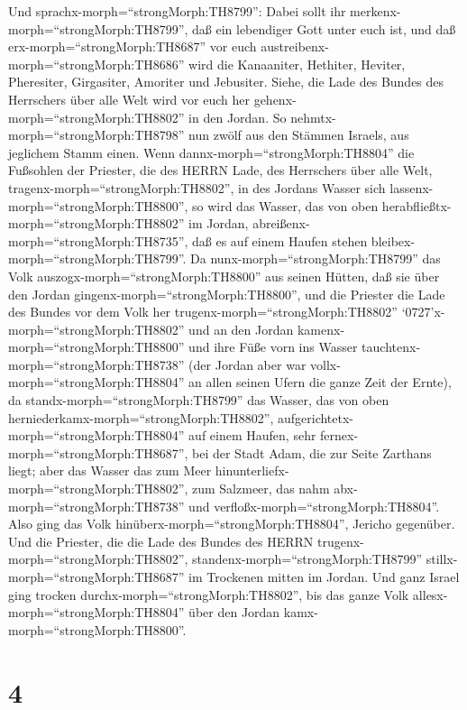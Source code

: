  Und sprachx-morph=``strongMorph:TH8799'': Dabei sollt ihr
merkenx-morph=``strongMorph:TH8799'', daß ein lebendiger Gott unter euch
ist, und daß erx-morph=``strongMorph:TH8687'' vor euch
austreibenx-morph=``strongMorph:TH8686'' wird die Kanaaniter, Hethiter,
Heviter, Pheresiter, Girgasiter, Amoriter und Jebusiter. 
Siehe, die Lade des Bundes des Herrschers über alle Welt wird vor euch
her gehenx-morph=``strongMorph:TH8802'' in den Jordan.  So
nehmtx-morph=``strongMorph:TH8798'' nun zwölf aus den Stämmen Israels,
aus jeglichem Stamm einen.  Wenn
dannx-morph=``strongMorph:TH8804'' die Fußsohlen der Priester, die des
HERRN Lade, des Herrschers über alle Welt,
tragenx-morph=``strongMorph:TH8802'', in des Jordans Wasser sich
lassenx-morph=``strongMorph:TH8800'', so wird das Wasser, das von oben
herabfließtx-morph=``strongMorph:TH8802'' im Jordan,
abreißenx-morph=``strongMorph:TH8735'', daß es auf einem Haufen stehen
bleibex-morph=``strongMorph:TH8799''.  Da
nunx-morph=``strongMorph:TH8799'' das Volk
auszogx-morph=``strongMorph:TH8800'' aus seinen Hütten, daß sie über den
Jordan gingenx-morph=``strongMorph:TH8800'', und die Priester die Lade
des Bundes vor dem Volk her trugenx-morph=``strongMorph:TH8802''
 `0727'x-morph=``strongMorph:TH8802'' und an den Jordan
kamenx-morph=``strongMorph:TH8800'' und ihre Füße vorn ins Wasser
tauchtenx-morph=``strongMorph:TH8738'' (der Jordan aber war
vollx-morph=``strongMorph:TH8804'' an allen seinen Ufern die ganze Zeit
der Ernte),  da standx-morph=``strongMorph:TH8799'' das
Wasser, das von oben herniederkamx-morph=``strongMorph:TH8802'',
aufgerichtetx-morph=``strongMorph:TH8804'' auf einem Haufen, sehr
fernex-morph=``strongMorph:TH8687'', bei der Stadt Adam, die zur Seite
Zarthans liegt; aber das Wasser das zum Meer
hinunterliefx-morph=``strongMorph:TH8802'', zum Salzmeer, das nahm
abx-morph=``strongMorph:TH8738'' und
verfloßx-morph=``strongMorph:TH8804''. Also ging das Volk
hinüberx-morph=``strongMorph:TH8804'', Jericho gegenüber. 
Und die Priester, die die Lade des Bundes des HERRN
trugenx-morph=``strongMorph:TH8802'',
standenx-morph=``strongMorph:TH8799''
stillx-morph=``strongMorph:TH8687'' im Trockenen mitten im Jordan. Und
ganz Israel ging trocken durchx-morph=``strongMorph:TH8802'', bis das
ganze Volk allesx-morph=``strongMorph:TH8804'' über den Jordan
kamx-morph=``strongMorph:TH8800''.

\hypertarget{section-3}{%
\section{4}\label{section-3}}

